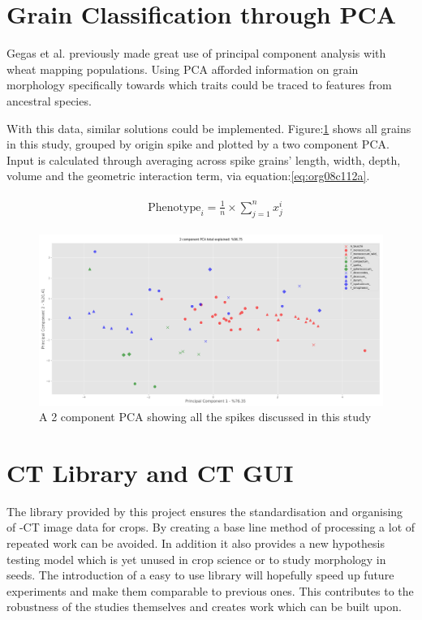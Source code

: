 \documentclass[11pt]{report}
\begin{document}
\section{Grain Classification through PCA}
\label{sec:org6273ff2}
Gegas et al. previously made great use of principal component analysis with wheat mapping populations. Using PCA afforded information on grain morphology specifically towards which traits could be traced to features from ancestral species.

With this data, similar solutions could be implemented. Figure:\ref{fig:org22a3c0e} shows all grains in this study, grouped by origin spike and plotted by a two component PCA. Input is calculated through averaging across spike grains' length, width, depth, volume and the geometric interaction term, via equation:\ref{eq:org08c112a}.

 \begin{align}
\label{eq:org08c112a}
   &\begin{aligned}
\text{Phenotype}_i = \frac{1}{n}\times\sum^n_{j=1}{x^i_j}
   \end{aligned}
 \end{align}


\begin{figure}[htbp]
\centering
\includegraphics[width=.9\linewidth]{./images/pca_all.png}
\caption{\label{fig:org22a3c0e}
A 2 component PCA showing all the spikes discussed in this study}
\end{figure}

\section{CT Library and CT GUI}
\label{sec:org105b11a}

The library provided by this project ensures the standardisation and organising of \textmu{}-CT image data for crops. By creating a base line method of processing a lot of repeated work can be avoided. In addition it also provides a new hypothesis testing model which is yet unused in crop science or to study morphology in seeds. The introduction of a easy to use library will hopefully speed up future experiments and make them comparable to previous ones. This contributes to the robustness of the studies themselves and creates work which can be built upon.
\end{document}
